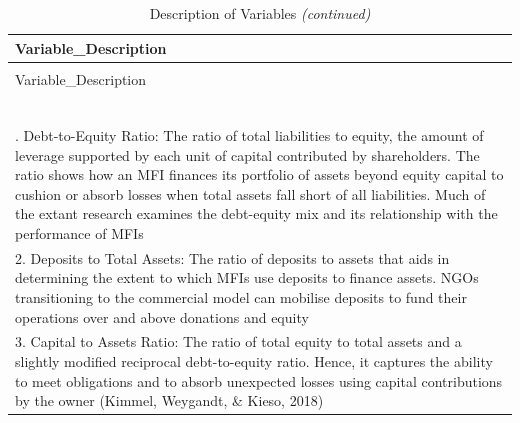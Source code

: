 \documentclass[a4paper, nobind]{templates/ociamthesis}
\begin{document}
\begin{longtabu} to 
\caption{\label{tab:unnamed-chunk-155}Description of Variables}\\
\toprule
Variable\_Description\\
\midrule
\endfirsthead
\caption[]{\label{tab:unnamed-chunk-155}Description of Variables \textit{(continued)}}\\
\toprule
Variable\_Description\\
\midrule
\endhead

\endfoot
\bottomrule
{}\\
\\
\\
\\
\\
\\
. Debt-to-Equity Ratio: The ratio of total liabilities to equity, the amount of leverage supported by each unit of capital contributed by shareholders. The ratio shows how an MFI finances its portfolio of assets beyond equity capital to cushion or absorb losses when total assets fall short of all liabilities. Much of the extant research examines the debt-equity mix and its relationship with the performance of MFIs\\
2. Deposits to Total Assets: The ratio of deposits to assets that aids in determining the extent to which MFIs use deposits to finance assets. NGOs transitioning to the commercial model can mobilise deposits  to fund their operations over and above donations and equity\\
3. Capital to Assets Ratio: The ratio of total equity to total assets and a slightly modified reciprocal debt-to-equity ratio. Hence, it captures the ability to meet obligations and to absorb unexpected losses using capital contributions by the owner (Kimmel, Weygandt, \& Kieso, 2018)\\

\end{longtabu}
\end{document}
